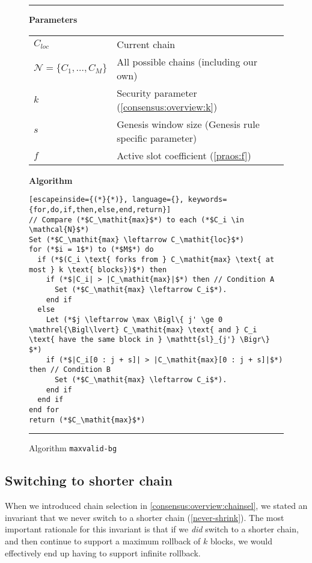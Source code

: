 \begin{figure}
\hrule

\textbf{Parameters} \\[0.5em]
\begin{tabular}{ll}
$C_\mathit{loc}$ & Current chain \\
$\mathcal{N} = \{C_1, \ldots, C_M\}$ & All possible chains (including our own) \\
$k$ & Security parameter (\cref{consensus:overview:k}) \\
$s$ & Genesis window size (Genesis rule specific parameter) \\
$f$ & Active slot coefficient (\cref{praos:f}) \\[1em]
\end{tabular}

\textbf{Algorithm}

\begin{lstlisting}[escapeinside={(*}{*)}, language={}, keywords={for,do,if,then,else,end,return}]
// Compare (*$C_\mathit{max}$*) to each (*$C_i \in \mathcal{N}$*)
Set (*$C_\mathit{max} \leftarrow C_\mathit{loc}$*)
for (*$i = 1$*) to (*$M$*) do
  if (*$(C_i \text{ forks from } C_\mathit{max} \text{ at most } k \text{ blocks})$*) then
    if (*$|C_i| > |C_\mathit{max}|$*) then // Condition A
      Set (*$C_\mathit{max} \leftarrow C_i$*).
    end if
  else
    Let (*$j \leftarrow \max \Bigl\{ j' \ge 0 \mathrel{\Bigl\lvert} C_\mathit{max} \text{ and } C_i \text{ have the same block in } \mathtt{sl}_{j'} \Bigr\} $*)
    if (*$|C_i[0 : j + s]| > |C_\mathit{max}[0 : j + s]|$*) then // Condition B
      Set (*$C_\mathit{max} \leftarrow C_i$*).
    end if
  end if
end for
return (*$C_\mathit{max}$*)
\end{lstlisting}

\hrule
\caption{\label{genesis:maxvalid-bg}Algorithm \texttt{maxvalid-bg}}
\end{figure}



\subsection{Switching to shorter chain}

When we introduced chain selection in \cref{consensus:overview:chainsel}, we
stated an invariant that we never switch to a shorter chain
(\cref{never-shrink}). The most important rationale for this invariant is that
if we \emph{did} switch to a shorter chain, and then continue to support a
maximum rollback of $k$ blocks, we would effectively end up having to
support infinite rollback.


